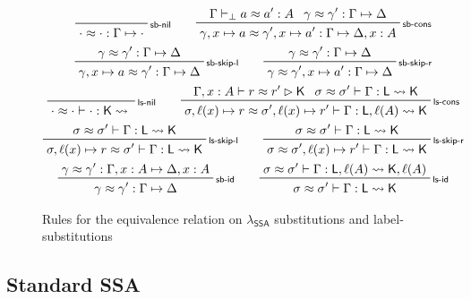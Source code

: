 \documentclass[acmsmall,screen,review]{acmart}
\newcommand{\ms}[1]{\ensuremath{\mathsf{#1}}}
\newcommand{\bhyp}[2]{#1 : #2}
\newcommand{\lhyp}[2]{#1(#2)}
\newcommand{\rle}[1]{{\scriptsize\textsf{#1}}}
\newcommand{\issubst}[3]{#1: #2 \mapsto #3}
\newcommand{\lbsubst}[4]{#1 \vdash #2: #3 \rightsquigarrow #4}
\newcommand{\teqv}{\approx}
\newcommand{\tmeq}[5]{#1 \vdash_{#2} #3 \teqv #4 : {#5}}
\newcommand{\lbeq}[4]{#1 \vdash #2 \teqv #3 \rhd {#4}}
\newcommand{\tmseq}[4]{\issubst{#1 \teqv #2}{#3}{#4}}
\newcommand{\lbseq}[5]{\lbsubst{#1 \teqv #2}{#3}{#4}{#5}}
\newcommand{\isotopessa}{\(\lambda_{\ms{SSA}}\)}
\begin{document}
\begin{figure}
  \begin{gather*}
    \prftree[r]{\rle{sb-nil}}{\tmseq{\cdot}{\cdot}{\Gamma}{\cdot}} \qquad
    \prftree[r]{\rle{sb-cons}}
      {\tmeq{\Gamma}{\bot}{a}{a'}{A}}{\tmseq{\gamma}{\gamma'}{\Gamma}{\Delta}}
      {\tmseq{\gamma, x \mapsto a}{\gamma', x \mapsto a'}{\Gamma}{\Delta, \bhyp{x}{A}}}
    \\
    \prftree[r]{\rle{sb-skip-l}}
      {\tmseq{\gamma}{\gamma'}{\Gamma}{\Delta}}
      {\tmseq{\gamma, x \mapsto a}{\gamma'}{\Gamma}{\Delta}} \qquad
    \prftree[r]{\rle{sb-skip-r}}
      {\tmseq{\gamma}{\gamma'}{\Gamma}{\Delta}}
      {\tmseq{\gamma}{\gamma', x \mapsto a'}{\Gamma}{\Delta}}
    \\
    \prftree[r]{\rle{ls-nil}}{\lbseq{\cdot}{\cdot}{\cdot}{\ms{K}}} \qquad
    \prftree[r]{\rle{ls-cons}}
      {\lbeq{\Gamma, \bhyp{x}{A}}{r}{r'}{\ms{K}}}
      {\lbseq{\sigma}{\sigma'}{\Gamma}{\ms{L}}{\ms{K}}}
      {\lbseq
        {\sigma, \ell(x) \mapsto r}{\sigma', \ell(x) \mapsto r'}{\Gamma}
        {\ms{L}, \ell(A)}{\ms{K}}}
    \\
    \prftree[r]{\rle{ls-skip-l}}
      {\lbseq{\sigma}{\sigma'}{\Gamma}{\ms{L}}{\ms{K}}}
      {\lbseq{\sigma, \ell(x) \mapsto r}{\sigma'}{\Gamma}{\ms{L}}{\ms{K}}}
      \qquad
    \prftree[r]{\rle{ls-skip-r}}
      {\lbseq{\sigma}{\sigma'}{\Gamma}{\ms{L}}{\ms{K}}}
      {\lbseq{\sigma}{\sigma', \ell(x) \mapsto r'}{\Gamma}{\ms{L}}{\ms{K}}}
    \\
    \prftree[r]{\rle{sb-id}}
      {\tmseq{\gamma}{\gamma'}{\Gamma, \bhyp{x}{A}}{\Delta, \bhyp{x}{A}}}
      {\tmseq{\gamma}{\gamma'}{\Gamma}{\Delta}} \qquad
    \prftree[r]{\rle{ls-id}}
      {\lbseq{\sigma}{\sigma'}{\Gamma}{\ms{L}, \lhyp{\ell}{A}}{\ms{K}, \lhyp{\ell}{A}}}
      {\lbseq{\sigma}{\sigma'}{\Gamma}{\ms{L}}{\ms{K}}}
  \end{gather*}
  \Description{}
  \caption{Rules for the equivalence relation on \isotopessa{} substitutions and label-substitutions}
  \label{fig:ssa-subst-equiv}
\end{figure}

\subsection{Standard SSA}

\label{ssec:ssa-normal}
\end{document}
